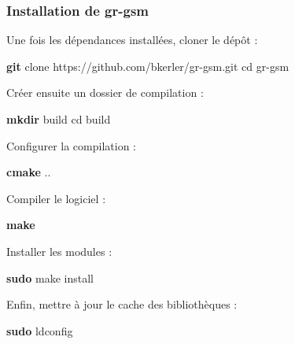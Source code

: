 \documentclass[
  french,
]{article}
\newenvironment{Shaded}{\begin{snugshade}}{\end{snugshade}}
\newcommand{\BuiltInTok}[1]{#1}
\newcommand{\FunctionTok}[1]{\textcolor[rgb]{0.13,0.29,0.53}{\textbf{#1}}}
\newcommand{\NormalTok}[1]{#1}
\begin{document}
\subsubsection{Installation de gr-gsm}\label{installation-de-gr-gsm-1}

Une fois les dépendances installées, cloner le dépôt :

\begin{Shaded}
\begin{Highlighting}[]
\FunctionTok{git}\NormalTok{ clone https://github.com/bkerler/gr{-}gsm.git}
\BuiltInTok{cd}\NormalTok{ gr{-}gsm}
\end{Highlighting}
\end{Shaded}

Créer ensuite un dossier de compilation :

\begin{Shaded}
\begin{Highlighting}[]
\FunctionTok{mkdir}\NormalTok{ build}
\BuiltInTok{cd}\NormalTok{ build}
\end{Highlighting}
\end{Shaded}

Configurer la compilation :

\begin{Shaded}
\begin{Highlighting}[]
\FunctionTok{cmake}\NormalTok{ ..}
\end{Highlighting}
\end{Shaded}

Compiler le logiciel :

\begin{Shaded}
\begin{Highlighting}[]
\FunctionTok{make}
\end{Highlighting}
\end{Shaded}

Installer les modules :

\begin{Shaded}
\begin{Highlighting}[]
\FunctionTok{sudo}\NormalTok{ make install}
\end{Highlighting}
\end{Shaded}

Enfin, mettre à jour le cache des bibliothèques :

\begin{Shaded}
\begin{Highlighting}[]
\FunctionTok{sudo}\NormalTok{ ldconfig}
\end{Highlighting}
\end{Shaded}
\end{document}
